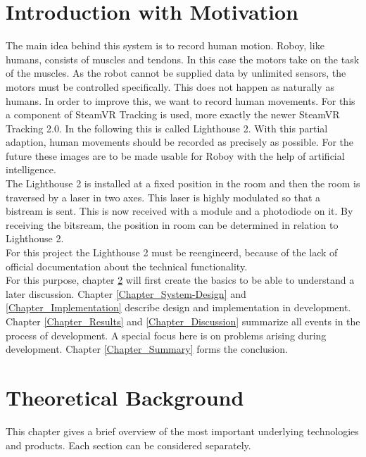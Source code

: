 \documentclass[a4paper,twoside, openright,12pt]{report}
\begin{document}
\chapter{Introduction with Motivation}
\label{Chapter_Inroduction}
The main idea behind this system is to record human motion. Roboy, like humans, consists of muscles and tendons. In this case the motors take on the task of the muscles. As the robot cannot be supplied data by unlimited sensors, the motors must be controlled specifically. This does not happen as naturally as humans. In order to improve this, we want to record human movements. For this a component of SteamVR Tracking is used, more exactly the newer SteamVR Tracking 2.0. In the following this is called Lighthouse 2. With this partial adaption, human movements should be recorded as precisely as possible. For the future these images are to be made usable for Roboy with the help of artificial intelligence. \\
The Lighthouse 2 is installed at a fixed position in the room and then the room is traversed by a laser in two axes. This laser is highly modulated so that a bistream is sent. This is now received with a module and a photodiode on it. By receiving the bitsream, the position in room can be determined in relation to Lighthouse 2. \\
For this project the Lighthouse 2 must be reengineerd, because of the lack of official documentation about the technical functionality. \\
For this purpose, chapter \ref{Chapter_Background} will first create the basics to be able to understand a later discussion. Chapter \ref{Chapter_System-Design} and \ref{Chapter_Implementation} describe design and implementation in development. Chapter \ref{Chapter_Results} and \ref{Chapter_Discussion} summarize all events in the process of development. A special focus here is on problems arising during development. Chapter \ref{Chapter_Summary} forms the conclusion.


\chapter{Theoretical Background}
\label{Chapter_Background}
This chapter gives a brief overview of the most important underlying technologies and products. Each section can be considered separately.
\end{document}
